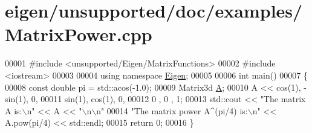 \hypertarget{eigen_2unsupported_2doc_2examples_2_matrix_power_8cpp_source}{}\section{eigen/unsupported/doc/examples/\+Matrix\+Power.cpp}
\label{eigen_2unsupported_2doc_2examples_2_matrix_power_8cpp_source}

\begin{DoxyCode}
00001 \textcolor{preprocessor}{#include <unsupported/Eigen/MatrixFunctions>}
00002 \textcolor{preprocessor}{#include <iostream>}
00003 
00004 \textcolor{keyword}{using namespace }\hyperlink{namespace_eigen}{Eigen};
00005 
00006 \textcolor{keywordtype}{int} main()
00007 \{
00008   \textcolor{keyword}{const} \textcolor{keywordtype}{double} pi = std::acos(-1.0);
00009   Matrix3d \hyperlink{group___core___module_class_eigen_1_1_matrix}{A};
00010   A << cos(1), -sin(1), 0,
00011        sin(1),  cos(1), 0,
00012        0 ,      0 , 1;
00013   std::cout << \textcolor{stringliteral}{"The matrix A is:\(\backslash\)n"} << A << \textcolor{stringliteral}{"\(\backslash\)n\(\backslash\)n"}
00014            \textcolor{stringliteral}{"The matrix power A^(pi/4) is:\(\backslash\)n"} << A.pow(pi/4) << std::endl;
00015   \textcolor{keywordflow}{return} 0;
00016 \}
\end{DoxyCode}
